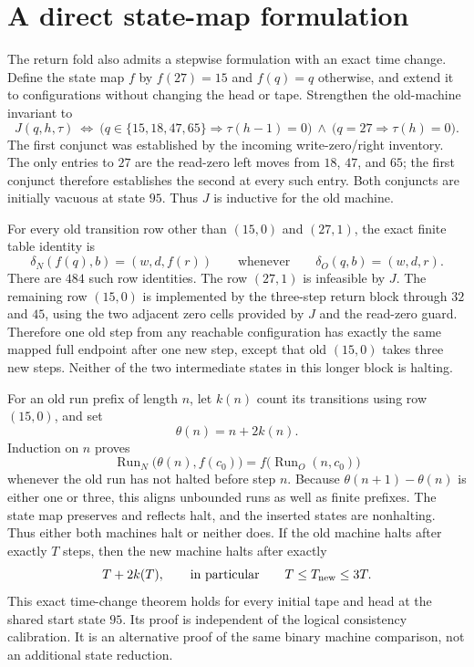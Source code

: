 \section{A direct state-map formulation}
\label{sec:direct-state-map}

The return fold also admits a stepwise formulation with an exact time
change. Define the state map $f$ by $f(27)=15$ and $f(q)=q$ otherwise,
and extend it to configurations without changing the head or tape.
Strengthen the old-machine invariant to
\[
 J(q,h,\tau)\ \Longleftrightarrow\
 \bigl(q\in\{15,18,47,65\}\Rightarrow\tau(h-1)=0\bigr)
 \ \land\
 \bigl(q=27\Rightarrow\tau(h)=0\bigr).
\]
The first conjunct was established by the incoming write-zero/right
inventory. The only entries to $27$ are the read-zero left moves from
$18$, $47$, and $65$; the first conjunct therefore establishes the
second at every such entry. Both conjuncts are initially vacuous at
state $95$. Thus $J$ is inductive for the old machine.

For every old transition row other than $(15,0)$ and $(27,1)$, the exact
finite table identity is
\[
 \delta_N(f(q),b)=(w,d,f(r))
 \qquad\text{whenever}\qquad
 \delta_O(q,b)=(w,d,r).
\]
There are $484$ such row identities. The row $(27,1)$ is infeasible by
$J$. The remaining row $(15,0)$ is implemented by the three-step
return block through $32$ and $45$, using the two adjacent zero cells
provided by $J$ and the read-zero guard. Therefore one old step from any
reachable configuration has exactly the same mapped full endpoint
after one new step, except that old $(15,0)$ takes three new steps.
Neither of the two intermediate states in this longer block is halting.

For an old run prefix of length $n$, let $k(n)$ count its transitions
using row $(15,0)$, and set
\[
 \theta(n)=n+2k(n).
\]
Induction on $n$ proves
\[
 \operatorname{Run}_N\bigl(\theta(n),f(c_0)\bigr)
 =f\bigl(\operatorname{Run}_O(n,c_0)\bigr)
\]
whenever the old run has not halted before step $n$. Because
$\theta(n+1)-\theta(n)$ is either one or three, this aligns unbounded
runs as well as finite prefixes. The state map preserves and reflects
halt, and the inserted states are nonhalting. Thus either both machines
halt or neither does. If the old machine halts after exactly $T$ steps,
then the new machine halts after exactly
\[
 T+2k(T),\qquad\text{in particular}\qquad
 T\le T_{\rm new}\le3T.
\]
This exact time-change theorem holds for every initial tape and head
at the shared start state $95$. Its proof is independent of the logical
consistency calibration. It is an alternative proof of the same binary
machine comparison, not an additional state reduction.
